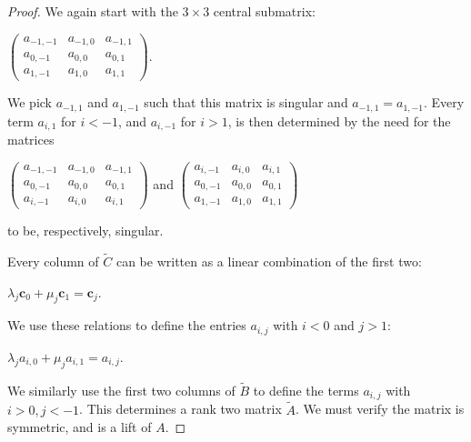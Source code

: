\documentclass{article}
\begin{document}
\begin{proof}
  We again start with the $3 \times 3$ central submatrix:  
  \begin{center}
    $\left(\begin{array}{ccc} a_{-1,-1} & a_{-1,0} & a_{-1,1} \\ a_{0,-1} & a_{0,0} & a_{0,1} \\ a_{1,-1} & a_{1,0} & a_{1,1} \end{array}\right)$.
  \end{center}  
  We pick $a_{-1,1}$ and $a_{1,-1}$ such that this matrix is singular and $a_{-1,1} = a_{1,-1}$. Every term $a_{i,1}$ for $i < -1$, and $a_{i,-1}$ for $i > 1$, is then determined by the need for the matrices 
  \begin{center}
    $\left(\begin{array}{ccc} a_{-1,-1} & a_{-1,0} & a_{-1,1} \\ a_{0,-1} & a_{0,0} & a_{0,1} \\ a_{i,-1} & a_{i,0} & a_{i,1}\end{array}\right)$ \hspace{.1 in} and \hspace{.1 in} $\left(\begin{array}{ccc} a_{i,-1} & a_{i,0} & a_{i,1} \\ a_{0,-1} & a_{0,0} & a_{0,1} \\ a_{1,-1} & a_{1,0} & a_{1,1} \end{array}\right)$
  \end{center}
  to be, respectively, singular.
  
  Every column of $\tilde{C}$ can be written as a linear combination of the first two:
  \begin{center}
    $\lambda_{j}\textbf{c}_{0} + \mu_{j}\textbf{c}_{1} = \textbf{c}_{j}$.  
  \end{center}
  We use these relations to define the entries $a_{i,j}$ with $i < 0$ and $j > 1$:
  \begin{center}
    $\lambda_{j}a_{i,0} + \mu_{j}a_{i,1} = a_{i,j}$.
  \end{center}
  We similarly use the first two columns of $\tilde{B}$ to define the terms $a_{i,j}$ with $i > 0, j < -1$. This determines a rank two matrix $\tilde{A}$. We must verify the matrix is symmetric, and is a lift of $A$.
  

\end{proof}
\end{document}
